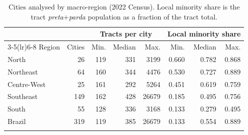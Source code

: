 \begin{table}[h]
\caption{Cities analysed by macro-region (2022 Census). Local minority share is the tract \emph{preta}$+$\emph{parda} population as a fraction of the tract total.}\label{tab:descriptive}%
\small
\begin{tabular}{@{}lrrrrrrr@{}}
\toprule
 & & \multicolumn{3}{c}{Tracts per city} & \multicolumn{3}{c}{Local minority share} \\
\cmidrule(lr){3-5}\cmidrule(lr){6-8}
Region & Cities & Min. & Median & Max. & Min. & Median & Max. \\
\midrule
North       & 26  & 119 & 331 & 3199  & 0.660 & 0.782 & 0.868 \\
Northeast   & 64  & 160 & 344 & 4476  & 0.530 & 0.727 & 0.889 \\
Centre-West & 25  & 161 & 292 & 5264  & 0.451 & 0.619 & 0.759 \\
Southeast   & 149 & 162 & 428 & 26679 & 0.185 & 0.495 & 0.756 \\
South       & 55  & 128 & 336 & 3168  & 0.133 & 0.279 & 0.495 \\
Brazil      & 319 & 119 & 385 & 26679 & 0.133 & 0.554 & 0.889 \\
\botrule
\end{tabular}
\end{table}
